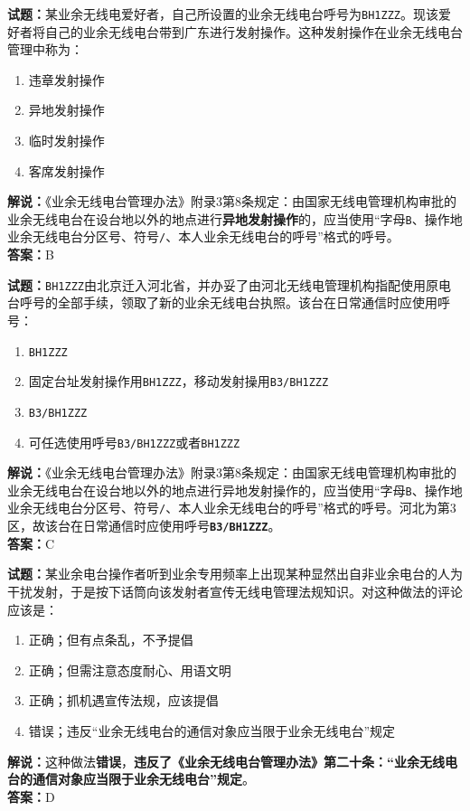 \documentclass{ctexbook}
\begin{document}
\bigskip

\noindent\textbf{试题：}某业余无线电爱好者，自己所设置的业余无线电台呼号为\texttt{BH1ZZZ}。现该爱好者将自己的业余无线电台带到广东进行发射操作。这种发射操作在业余无线电台管理中称为：
\begin{enumerate}[leftmargin=3em]
  \item 违章发射操作
  \item 异地发射操作
  \item 临时发射操作
  \item 客席发射操作
\end{enumerate}
\noindent\textbf{解说：}《业余无线电台管理办法》附录3第8条规定：由国家无线电管理机构审批的业余无线电台在设台地以外的地点进行\textbf{异地发射操作}的，应当使用“字母\texttt{B}、操作地业余无线电台分区号、符号\texttt{/}、本人业余无线电台的呼号”格式的呼号。\\\noindent\textbf{答案：}B

\bigskip

\noindent\textbf{试题：}\texttt{BH1ZZZ}由北京迁入河北省，并办妥了由河北无线电管理机构指配使用原电台呼号的全部手续，领取了新的业余无线电台执照。该台在日常通信时应使用呼号：
\begin{enumerate}[leftmargin=3em]
  \item \texttt{BH1ZZZ}
  \item 固定台址发射操作用\texttt{BH1ZZZ}，移动发射操用\texttt{B3/BH1ZZZ}
  \item \texttt{B3/BH1ZZZ}
  \item 可任选使用呼号\texttt{B3/BH1ZZZ}或者\texttt{BH1ZZZ}
\end{enumerate}
\noindent\textbf{解说：}《业余无线电台管理办法》附录3第8条规定：由国家无线电管理机构审批的业余无线电台在设台地以外的地点进行异地发射操作的，应当使用“字母\texttt{B}、操作地业余无线电台分区号、符号\texttt{/}、本人业余无线电台的呼号”格式的呼号。河北为第3区，故该台在日常通信时应使用呼号\texttt{\textbf{B3/BH1ZZZ}}。\\\noindent\textbf{答案：}C

\bigskip

\noindent\textbf{试题：}某业余电台操作者听到业余专用频率上出现某种显然出自非业余电台的人为干扰发射，于是按下话筒向该发射者宣传无线电管理法规知识。对这种做法的评论应该是：
\begin{enumerate}[leftmargin=3em]
  \item 正确；但有点条乱，不予提倡
  \item 正确；但需注意态度耐心、用语文明
  \item 正确；抓机遇宣传法规，应该提倡
  \item 错误；违反“业余无线电台的通信对象应当限于业余无线电台”规定
\end{enumerate}
\noindent\textbf{解说：}这种做法\textbf{错误}，\textbf{违反了《业余无线电台管理办法》第二十条：“业余无线电台的通信对象应当限于业余无线电台”规定}。\\\noindent\textbf{答案：}D
\end{document}

